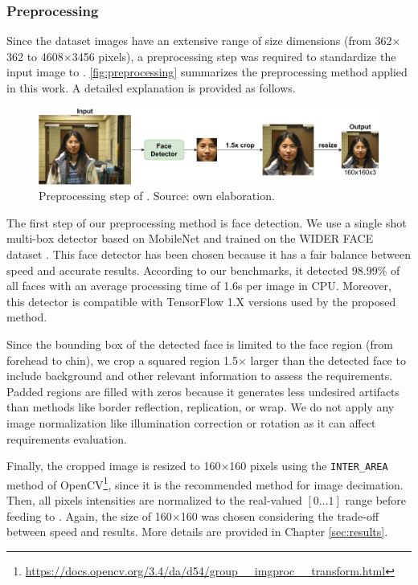\subsubsection{Preprocessing} \label{sec:preprocessing}

Since the \adhoc dataset images have an extensive range of size dimensions (from 362$\times$362 to 4608$\times$3456 pixels), a preprocessing step was required to standardize the input image to \methodname. \autoref{fig:preprocessing} summarizes the preprocessing method applied in this work. A detailed explanation is provided as follows.

\begin{figure}
\centering
\includegraphics[width=\linewidth]{images/preprocessing.pdf}
\caption{Preprocessing step of \methodname. Source: own elaboration.}
\label{fig:preprocessing}
\end{figure}

The first step of our preprocessing method is face detection. We use a single shot multi-box detector based on MobileNet \citep{yeephycho} and trained on the WIDER FACE dataset \citep{yang2016wider}. This face detector has been chosen because it has a fair balance between speed and accurate results. According to our benchmarks, it detected 98.99\% of all faces with an average processing time of 1.6s per image in CPU. Moreover, this detector is compatible with TensorFlow 1.X versions used by the proposed method. 

Since the bounding box of the detected face is limited to the face region (from forehead to chin), we crop a squared region 1.5$\times$ larger than the detected face to include background and other relevant information to assess the requirements. Padded regions are filled with zeros because it generates less undesired artifacts than methods like border reflection, replication, or wrap. We do not apply any image normalization like illumination correction or rotation as it can affect requirements evaluation. 

Finally, the cropped image is resized to 160$\times$160 pixels using the \texttt{INTER\_AREA} method of OpenCV\footnote{\url{https://docs.opencv.org/3.4/da/d54/group__imgproc__transform.html}}, since it is the recommended method for image decimation. Then, all pixels intensities are normalized to the real-valued $[0...1]$ range before feeding to \methodname. Again, the size of 160$\times$160 was chosen considering the trade-off between speed and results. More details are provided in Chapter \ref{sec:results}. 

